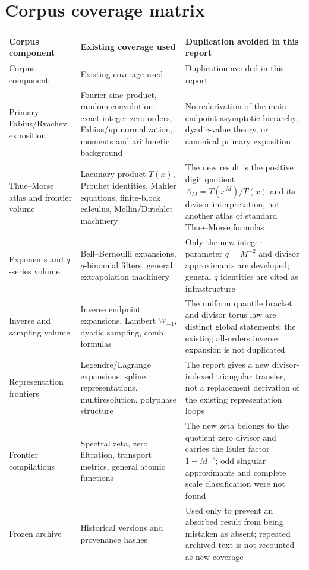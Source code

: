 \documentclass[11pt,oneside]{article}
\theoremstyle{definition}
\theoremstyle{remark}
\numberwithin{equation}{section}
\newcommand{\1}{\mathbf 1}
\begin{document}
\section{Corpus coverage matrix}
\label{app:corpus}

\begin{longtable}{p{}p{}p{}}
\toprule
Corpus component & Existing coverage used & Duplication avoided in this report\\
\midrule
\endfirsthead
\toprule
Corpus component & Existing coverage used & Duplication avoided in this report\\
\midrule
\endhead
Primary Fabius/Rvachev exposition & Fourier sinc product, random convolution, exact integer zero orders, Fabius/up normalization, moments and arithmetic background & No rederivation of the main endpoint asymptotic hierarchy, dyadic-value theory, or canonical primary exposition\\
\addlinespace
Thue--Morse atlas and frontier volume & Lacunary product $T(x)$, Prouhet identities, Mahler equations, finite-block calculus, Mellin/Dirichlet machinery & The new result is the positive digit quotient $A_M=T(x^M)/T(x)$ and its divisor interpretation, not another atlas of standard Thue--Morse formulas\\
\addlinespace
Exponents and $q$-series volume & Bell--Bernoulli expansions, $q$-binomial filters, general extrapolation machinery & Only the new integer parameter $q=M^{-2}$ and divisor approximants are developed; general $q$ identities are cited as infrastructure\\
\addlinespace
Inverse and sampling volume & Inverse endpoint expansions, Lambert $W_{-1}$, dyadic sampling, comb formulas & The uniform quantile bracket and divisor torus law are distinct global statements; the existing all-orders inverse expansion is not duplicated\\
\addlinespace
Representation frontiers & Legendre/Lagrange expansions, spline representations, multiresolution, polyphase structure & The report gives a new divisor-indexed triangular transfer, not a replacement derivation of the existing representation loops\\
\addlinespace
Frontier compilations & Spectral zeta, zero filtration, transport metrics, general atomic functions & The new zeta belongs to the quotient zero divisor and carries the Euler factor $1-M^{-s}$; odd singular approximants and complete scale classification were not found\\
\addlinespace
Frozen archive & Historical versions and provenance hashes & Used only to prevent an absorbed result from being mistaken as absent; repeated archived text is not recounted as new coverage\\
\bottomrule
\end{longtable}
\end{document}
